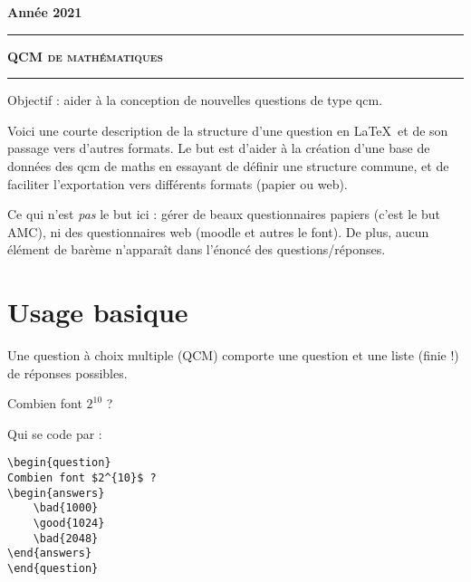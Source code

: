 \documentclass[12pt,a4paper]{article}
\begin{document}
 


\hfill\textbf{Ann\'ee 2021}

\vspace*{0.5ex}
\hrule\vspace*{1.5ex} 
\hfil\textsc{\textbf{\Large QCM de mathématiques}}
\vspace*{1ex} \hrule 
\vspace*{5ex} 


Objectif : aider à la conception de nouvelles questions de type qcm.

\bigskip

Voici une courte description de la structure d'une question en \LaTeX\ et de son passage vers d'autres formats. Le but est d'aider à la création d'une base de données des qcm de maths en essayant de définir une structure commune, et de faciliter l'exportation vers différents formats (papier ou web).

\bigskip

Ce qui n'est \emph{pas} le but ici : gérer de beaux questionnaires papiers (c'est le but AMC), ni des questionnaires web (moodle et autres le font). De plus, aucun élément de barème n'apparaît dans l'énoncé des questions/réponses. 



\section{Usage basique}

Une question à choix multiple (QCM) comporte une question et une liste (finie !) de réponses possibles.


\begin{center}
\begin{minipage}{0.8\textwidth}
\begin{question}
Combien font $2^{10}$ ?
\begin{answers}
\end{answers}
\end{question}
\end{minipage}
\end{center}

Qui se code par :
\begin{center}
\begin{minipage}{0.8\textwidth}
\begin{verbatim}
\begin{question}
Combien font $2^{10}$ ?
\begin{answers}
    \bad{1000}
    \good{1024}
    \bad{2048}
\end{answers}
\end{question}
\end{verbatim}
\end{minipage}
\end{center}
\end{document}
